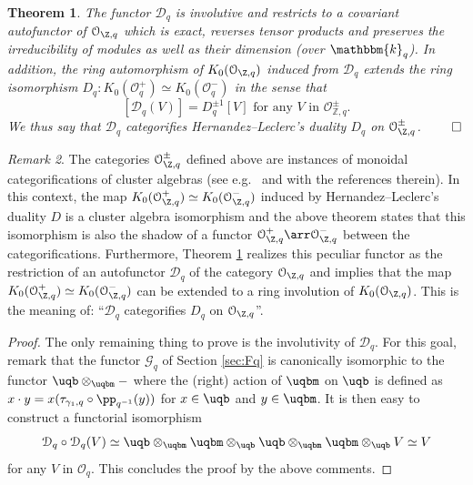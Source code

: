 \documentclass[11pt]{amsart}
\newtheorem{theorem}{Theorem}[section]
\theoremstyle{definition}
\theoremstyle{remark}
\newtheorem{rem}[theorem]{Remark}
\numberwithin{equation}{section}
\begin{document}
\begin{theorem}\label{thm:DCat}
The functor $\mathcal{D}_q$ is involutive and restricts to a covariant autofunctor of $\mathcal{O}_{\Z,q}$ which is exact, reverses tensor products and preserves the irreducibility of modules as well as their dimension (over $\mathbbm{k}_q$). In addition, the ring automorphism of $K_0(\mathcal{O}_{\Z,q})$ induced from $\mathcal{D}_q$ extends the ring isomorphism $D_q:K_0(\mathcal{O}_q^+)\simeq K_0(\mathcal{O}_q^-)$ in the sense that 
$$ [\mathcal{D}_q(V)] = D_q^{\pm 1}[V] \text{ for any }V\text{ in }\mathcal{O}_{\mathbb{Z},q}^{\pm}. $$
We thus say that $\mathcal{D}_q$ categorifies Hernandez--Leclerc's duality $D_q$ on $\mathcal{O}_{\Z,q}^{\pm}$. \hfill $\qed$
\end{theorem}
\begin{rem}\label{rem:MonCatClust}
The categories $\mathcal{O}_{\Z,q}^{\pm}$ defined above are instances of monoidal categorifications of cluster algebras (see e.g.~\cite{kkop2,kkop3} and \cite[Section 8.4]{hshift} with the references therein). In this context, the map $K_0(\mathcal{O}_{\Z,q}^+)\simeq K_0(\mathcal{O}_{\Z,q}^-)$ induced by Hernandez--Leclerc's duality $D$ is a cluster algebra isomorphism and the above theorem states that this isomorphism is also the shadow of a functor $\mathcal{O}^+_{\Z,q} \arr \mathcal{O}^-_{\Z,q}$ between the categorifications. Furthermore, Theorem \ref{thm:DCat} realizes this peculiar functor as the restriction of an autofunctor $\mathcal{D}_q$ of the category $\mathcal{O}_{\Z,q}$ and implies that the map $K_0(\mathcal{O}_{\Z,q}^+)\simeq K_0(\mathcal{O}_{\Z,q}^-)$ can be extended to a ring involution of $K_0(\mathcal{O}_{\Z,q})$. This is the meaning of: ``$\mathcal{D}_q$ categorifies $D_q$ on $\mathcal{O}_{\Z,q}$''. 
\end{rem}
\begin{proof}
The only remaining thing to prove is the involutivity of $\mathcal{D}_q$. For this goal, remark that the functor $\mathcal{G}_q$ of Section \ref{sec:Fq} is canonically isomorphic to the functor $\uqb\otimes_{\uqbm}-$ where the (right) action of $\uqbm$ on $\uqb$ is defined as $x\cdot y = x(\tau_{\gamma_1,q}\circ \pp_{q^{-1}}(y))$ for $x\in \uqb$ and $y\in \uqbm$. It is then easy to construct a functorial isomorphism
$$ \mathcal{D}_q\circ\mathcal{D}_q(V) \simeq \uqb \otimes_{\uqbm} \uqbm \otimes_{\uqb} \uqb \otimes_{\uqbm} \uqbm \otimes_{\uqb} V \simeq V$$
for any $V$ in $\mathcal{O}_q$. This concludes the proof by the above comments.
\end{proof}
\end{document}
